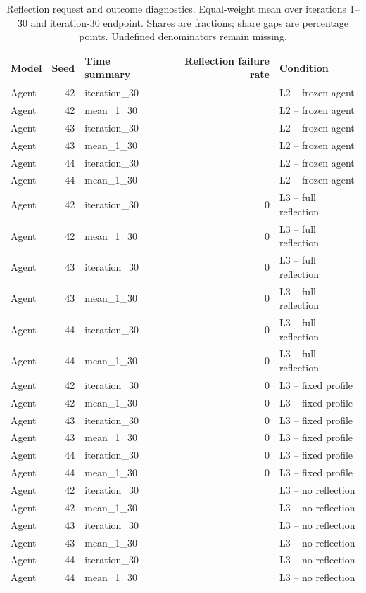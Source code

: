 \begin{table}[htbp!]
\centering
\small
\setlength{\tabcolsep}{3pt}
\renewcommand{\arraystretch}{1.1}
\begin{tabular}{lrlrl}
\hline
Model & Seed & Time summary & Reflection failure rate & Condition \\
\hline
Agent & 42 & iteration\_30 & \textemdash{} & L2 -- frozen agent \\
Agent & 42 & mean\_1\_30 & \textemdash{} & L2 -- frozen agent \\
Agent & 43 & iteration\_30 & \textemdash{} & L2 -- frozen agent \\
Agent & 43 & mean\_1\_30 & \textemdash{} & L2 -- frozen agent \\
Agent & 44 & iteration\_30 & \textemdash{} & L2 -- frozen agent \\
Agent & 44 & mean\_1\_30 & \textemdash{} & L2 -- frozen agent \\
Agent & 42 & iteration\_30 & 0 & L3 -- full reflection \\
Agent & 42 & mean\_1\_30 & 0 & L3 -- full reflection \\
Agent & 43 & iteration\_30 & 0 & L3 -- full reflection \\
Agent & 43 & mean\_1\_30 & 0 & L3 -- full reflection \\
Agent & 44 & iteration\_30 & 0 & L3 -- full reflection \\
Agent & 44 & mean\_1\_30 & 0 & L3 -- full reflection \\
Agent & 42 & iteration\_30 & 0 & L3 -- fixed profile \\
Agent & 42 & mean\_1\_30 & 0 & L3 -- fixed profile \\
Agent & 43 & iteration\_30 & 0 & L3 -- fixed profile \\
Agent & 43 & mean\_1\_30 & 0 & L3 -- fixed profile \\
Agent & 44 & iteration\_30 & 0 & L3 -- fixed profile \\
Agent & 44 & mean\_1\_30 & 0 & L3 -- fixed profile \\
Agent & 42 & iteration\_30 & \textemdash{} & L3 -- no reflection \\
Agent & 42 & mean\_1\_30 & \textemdash{} & L3 -- no reflection \\
Agent & 43 & iteration\_30 & \textemdash{} & L3 -- no reflection \\
Agent & 43 & mean\_1\_30 & \textemdash{} & L3 -- no reflection \\
Agent & 44 & iteration\_30 & \textemdash{} & L3 -- no reflection \\
Agent & 44 & mean\_1\_30 & \textemdash{} & L3 -- no reflection \\
\hline
\end{tabular}
\caption{Reflection request and outcome diagnostics. Equal-weight mean over iterations 1--30 and iteration-30 endpoint. Shares are fractions; share gaps are percentage points. Undefined denominators remain missing.}
\label{chap:results:tab:rq3_agents_reflection_failure}
\end{table}
